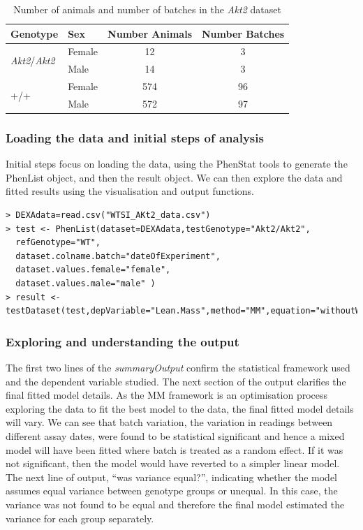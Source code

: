\documentclass[12pt,a4paper]{article}
\begin{document}
\begin{table}[!h]
\begin{center}
\begin{tabular}{| l | l | c | c |}
  \hline
Genotype&Sex&Number Animals&Number Batches\\\hline
\multirow{2}{*}{\textit{Akt2}\slash \textit{Akt2}}&Female&12&3\\
			    &Male&14&3\\
			    \hline
\multirow{2}{*}{+\slash +}&Female&574&96\\
			    &Male&572&97\\

\hline  
\end{tabular}
\caption{Number of animals and number of batches in the \textit{Akt2} dataset}\label{table:08}
\end{center}
\end{table}

\subsubsection{Loading the data and initial steps of analysis}
Initial steps focus on loading the data, using the PhenStat tools to generate the PhenList object, and then the result object.  
We can then explore the data and fitted results using the visualisation and output functions.   
\begingroup
    \fontsize{8pt}{12pt}\selectfont
\begin{verbatim}
> DEXAdata=read.csv("WTSI_AKt2_data.csv")
> test <- PhenList(dataset=DEXAdata,testGenotype="Akt2/Akt2",  
  refGenotype="WT",
  dataset.colname.batch="dateOfExperiment", 
  dataset.values.female="female", 
  dataset.values.male="male" )
> result <- testDataset(test,depVariable="Lean.Mass",method="MM",equation="withoutWeight")
\end{verbatim}
\endgroup 



\subsubsection{Exploring and understanding the output}
\label{cs1_output}
The first two lines of the \textit{summaryOutput} confirm the statistical framework used and the dependent variable studied.   
The next section of the output clarifies the final fitted model details. As the MM framework is an optimisation process exploring the data to fit the best model to the data, 
the final fitted model details will vary. We can see that batch variation, the variation in readings between different assay dates, 
were found to be statistical significant and hence a mixed model will have been fitted where batch is treated as a random effect.  
If it was not significant, then the model would have reverted to a simpler linear model.  
The next line of output, “was variance equal?”, indicating whether the model assumes equal variance between genotype groups or unequal.  
In this case, the variance was not found to be equal and therefore the final model estimated the variance for each group separately. 
\end{document}
